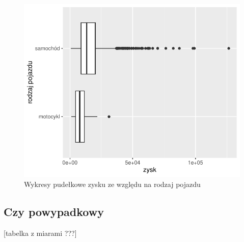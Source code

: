 \documentclass{article}\usepackage[]{graphicx}\usepackage[]{xcolor}
\makeatletter
\def\maxwidth{ %
  \ifdim\Gin@nat@width>\linewidth
    \linewidth
  \else
    \Gin@nat@width
  \fi
}
\newenvironment{knitrout}{}{} %
\makeatother
\begin{document}
\begin{knitrout}
\color{fgcolor}\begin{figure}

{\centering \includegraphics[width=\maxwidth]{figure/fig_typ-1} 

}

\caption[Wykresy pudełkowe zysku ze względu na rodzaj pojazdu]{Wykresy pudełkowe zysku ze względu na rodzaj pojazdu}\label{fig:fig_typ}
\end{figure}

\end{knitrout}

\subsection{Czy powypadkowy}

[tabelka z miarami ???]
\end{document}
